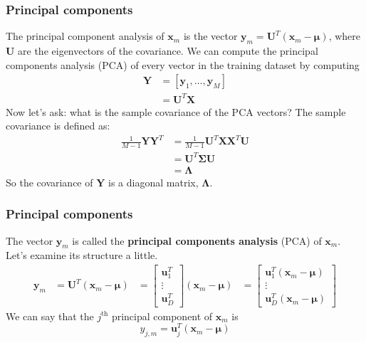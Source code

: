 \documentclass{beamer}
\begin{document}
\begin{frame}
  \frametitle{Principal components}

  The principal component analysis of $\mathbf{x}_m$ is the vector
  $\mathbf{y}_m=\mathbf{U}^T(\mathbf{x}_m-\bm{\mu})$, where $\mathbf{U}$
  are the eigenvectors of the covariance.
  We can compute the principal components analysis (PCA) of every
  vector in the training dataset by computing
  \begin{align*}
    \mathbf{Y}&=[\mathbf{y}_1,\ldots,\mathbf{y}_M]\\
    &=\mathbf{U}^T\mathbf{X}
  \end{align*}
  Now let's ask: what is the sample covariance of the PCA vectors?
  The sample covariance is defined as:
  \begin{align*}
    \frac{1}{M-1}\mathbf{Y}\mathbf{Y}^T
    &= \frac{1}{M-1}\mathbf{U}^T\mathbf{X}\mathbf{X}^T\mathbf{U}\\
    &= \mathbf{U}^T\bm{\Sigma}\mathbf{U}\\
    &= \bm{\Lambda}
  \end{align*}
  So the covariance of $\mathbf{Y}$ is a diagonal matrix,
  $\bm{\Lambda}$.
\end{frame}

\begin{frame}
  \frametitle{Principal components}
  
  The vector $\mathbf{y}_m$ is called the \textbf{principal components
    analysis} (PCA) of $\mathbf{x}_m$.  Let's examine its structure a
  little.
  \begin{align*}
    \mathbf{y}_m
    &= \mathbf{U}^T(\mathbf{x}_m-\bm{\mu}) 
    &= \left[\begin{array}{c}\mathbf{u}_1^T\\\vdots\\\mathbf{u}_D^T\end{array}\right]
    (\mathbf{x}_m-\bm{\mu})
    &= \left[\begin{array}{c}\mathbf{u}_1^T(\mathbf{x}_m-\bm{\mu})\\
        \vdots\\
        \mathbf{u}_D^T(\mathbf{x}_m-\bm{\mu})\end{array}\right]
  \end{align*}
  We can say that the $j^{\text{th}}$ principal component of $\mathbf{x}_m$ is
  \begin{displaymath}
    y_{j,m} = \mathbf{u}_j^T(\mathbf{x}_m-\bm{\mu})
  \end{displaymath}
\end{frame}
\end{document}
